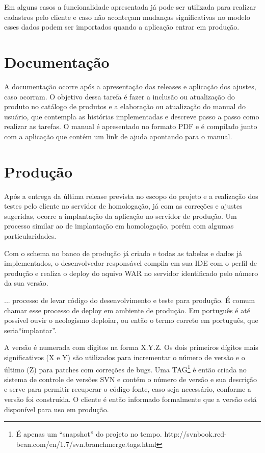 Em alguns casos a funcionalidade apresentada já pode ser utilizada para realizar cadastros pelo cliente e caso não aconteçam mudanças significativas no modelo esses dados podem ser importados quando a aplicação entrar em produção. 



\section{Documentação}
\label{sec:atividadesRealizadasDocumentacao}

A documentação ocorre após a apresentação das releases e aplicação dos ajustes, caso ocorram. O objetivo dessa tarefa é fazer a inclusão ou atualização do produto no catálogo de  produtos e a elaboração ou atualização do manual do usuário, que contempla as histórias implementadas e descreve passo a passo como realizar as tarefas. O manual é apresentado no formato PDF e é compilado junto com a aplicação que contém um link de ajuda apontando para o manual.


\section{Produção}
\label{sec:atividadesRealizadasProdução}

Após a entrega da última release prevista no escopo do projeto e a realização dos testes pelo cliente no servidor de homologação, já com as correções e ajustes sugeridas, ocorre a implantação da aplicação no servidor de produção. Um processo similar ao de implantação em homologação, porém com algumas particularidades.

Com o schema no banco de produção já criado e todas as tabelas e dados já implementados, o desenvolvedor responsável compila em sua IDE com o perfil de produção e realiza o deploy do aquivo WAR no servidor identificado pelo número da sua versão.

\begin{citacao}
... processo de levar código do desenvolvimento e teste para produção. É comum chamar esse processo de deploy em ambiente de
produção. Em português é até possível ouvir o neologismo deploiar, ou então o termo correto em português, que seria“implantar”. \cite[p.~19]{Sato2014}
\end{citacao}

A versão é numerada com dígitos na forma X.Y.Z. Os dois primeiros dígitos mais significativos (X e Y) são utilizados para incrementar o número de versão e o último (Z) para patches com correções de bugs. Uma  TAG\footnote{ É apenas um “snapshot” do projeto no tempo. http://svnbook.red-bean.com/en/1.7/svn.branchmerge.tags.html} é então criada no sistema de controle de versões SVN e contém o número de versão e sua descrição e serve para permitir recuperar o código-fonte, caso seja necessário, conforme a versão foi construída. O cliente é então informado formalmente que a versão está disponível para uso em produção.

